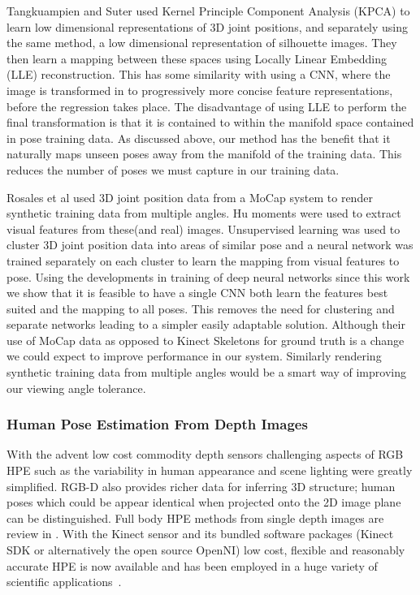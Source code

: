 \documentclass[11pt]{article} %
\begin{document}
Tangkuampien and Suter \cite{Tangkuampien2006} used Kernel Principle Component Analysis (KPCA) to learn low dimensional representations of 3D joint positions, and separately using the same method, a low dimensional representation of silhouette images. They then learn a mapping between these spaces using Locally Linear Embedding (LLE) reconstruction. This has some similarity with using a CNN, where the image is transformed in to progressively more concise feature representations, before the regression takes place. The disadvantage of using LLE to perform the final transformation is that it is contained to within the manifold space contained in pose training data. As discussed above, our method has the benefit that it naturally maps unseen poses away from the manifold of the training data. This reduces the number of poses we must capture in our training data.

Rosales et al \cite{Rosales2000,Rosales2001} used 3D joint position data from a MoCap system to render synthetic training data from multiple angles. Hu moments were used to extract visual features from these(and real) images. Unsupervised learning was used to cluster 3D joint position data into areas of similar pose and a neural network was trained separately on each cluster to learn the mapping from visual features to pose. Using the developments in training of deep neural networks since this work we show that it is feasible to have a single CNN both learn the features best suited and the mapping to all poses. This removes the need for clustering and separate networks leading to a simpler easily adaptable solution. Although their use of MoCap data as opposed to Kinect Skeletons for ground truth is a change we could expect to improve performance in our system. Similarly rendering synthetic training data from multiple angles would be a smart way of improving our viewing angle tolerance.

\subsubsection{Human Pose Estimation From Depth Images}

With the advent low cost commodity depth sensors challenging aspects of RGB HPE such as the variability in human appearance and scene lighting were greatly simplified. RGB-D also provides richer data for inferring 3D structure; human poses which could be appear identical when projected onto the 2D image plane can be distinguished. Full body HPE methods from single depth images are review in \cite{Helten2013}. With the Kinect sensor and its bundled software packages (Kinect SDK or alternatively the open source OpenNI) low cost, flexible and reasonably accurate HPE is now available and has been employed in a huge variety of scientific applications~\cite{Han2013,Giovanni}.
\end{document}
